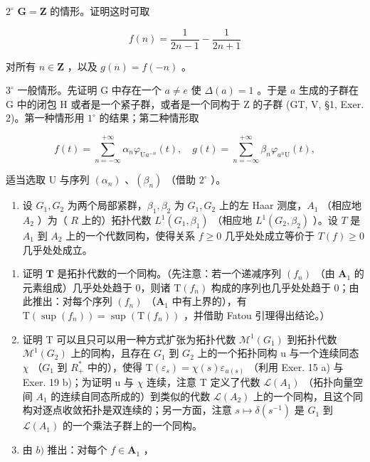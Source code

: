 \(2^{\circ}\) \(\mathbf{G} = \mathbf{Z}\) 的情形。证明这时可取

\[
f (n) = \frac {1}{2 n - 1} - \frac {1}{2 n + 1}
\]

对所有 \(n \in \mathbf{Z}\) ，以及 \(g(n) = f(-n)\) 。

\(3^{\circ}\) 一般情形。先证明 G 中存在一个 \(a \neq e\) 使 \(\Delta(a) = 1\) 。于是 \(a\) 生成的子群在 G 中的闭包 H 或者是一个紧子群，或者是一个同构于 Z 的子群 (GT, V, §1, Exer. 2)。第一种情形用 \(1^{\circ}\) 的结果；第二种情形取

\[
f (t) = \sum_ {n = - \infty} ^ {+ \infty} \alpha_ {n} \varphi_ {\mathrm{U} a ^ {- n}} (t), \quad g (t) = \sum_ {n = - \infty} ^ {+ \infty} \beta_ {n} \varphi_ {a ^ {n} \mathrm{U}} (t),
\]

适当选取 U 与序列 \((\alpha_{n})\) 、\((\beta_{n})\) （借助 \(2^{\circ}\) ）。

\begin{enumerate}
\def\labelenumi{\arabic{enumi})}
\setcounter{enumi}{27}
\tightlist
\item
  设 \(G_1, G_2\) 为两个局部紧群，\(\beta_1, \beta_2\) 为 \(G_1, G_2\) 上的左 Haar 测度，\(A_1\) （相应地 \(A_2\) ）为（ \(R\) 上的）拓扑代数 \(L^1(G_1, \beta_1)\) （相应地 \(L^1(G_2, \beta_2)\) ）。设 \(T\) 是 \(A_1\) 到 \(A_2\) 上的一个代数同构，使得关系 \(f \geqslant 0\) 几乎处处成立等价于 \(T(f) \geqslant 0\) 几乎处处成立。
\end{enumerate}

\begin{enumerate}
\def\labelenumi{\alph{enumi})}
\item
  证明 \(\mathbf{T}\) 是拓扑代数的一个同构。（先注意：若一个递减序列 \((f_n)\) （由 \(\mathbf{A}_1\) 的元素组成）几乎处处趋于 0，则诸 \(\mathrm{T}(f_n)\) 构成的序列也几乎处处趋于 0；由此推出：对每个序列 \((f_n)\) （\(\mathbf{A}_1\) 中有上界的），有 \(\mathrm{T}(\sup (f_n)) = \sup (\mathrm{T}(f_n))\) ，并借助 Fatou 引理得出结论。）
\item
  证明 T 可以且只可以用一种方式扩张为拓扑代数 \(\mathcal{M}^{1}(G_{1})\) 到拓扑代数 \(\mathcal{M}^{1}(G_{2})\) 上的同构，且存在 \(G_{1}\) 到 \(G_{2}\) 上的一个拓扑同构 u 与一个连续同态 \(\chi\) （\(G_{1}\) 到 \(R_{+}^{*}\) 中的），使得 \(\mathrm{T}(\varepsilon_{s}) = \chi(s)\varepsilon_{u(s)}\) （利用 Exer. 15 a) 与 Exer. 19 b)；为证明 u 与 \(\chi\) 连续，注意 T 定义了代数 \(\mathcal{L}(A_{1})\) （拓扑向量空间 \(A_{1}\) 的连续自同态所成的）到类似的代数 \(\mathcal{L}(A_{2})\) 上的一个同构，且这个同构对逐点收敛拓扑是双连续的；另一方面，注意 \(s \mapsto \delta(s^{-1})\) 是 \(G_{1}\) 到 \(\mathcal{L}(A_{1})\) 的一个乘法子群上的一个同构。
\item
  由 \(b)\) 推出：对每个 \(f \in \mathbf{A}_1\) ，
\end{enumerate}

